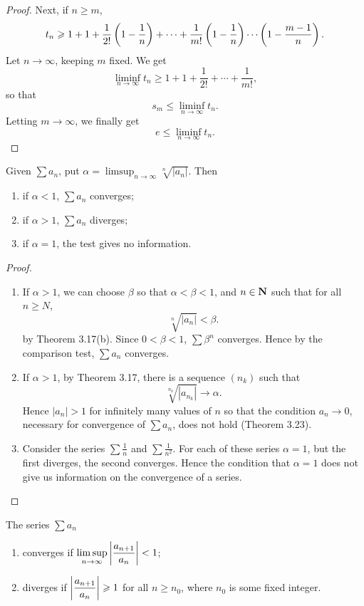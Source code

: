 \begin{example}
\begin{proof}
Next, if $n\ge m$,
\[t_n\geqslant1+1+\frac{1}{2!}\left(1-\frac{1}{n}\right)+\cdots+\frac{1}{m!}\left(1-\frac{1}{n}\right)\cdots\left(1-\frac{m-1}{n}\right).\]
Let $n\to\infty$, keeping $m$ fixed. We get
\[\liminf_{n\to\infty}t_n\ge1+1+\frac{1}{2!}+\cdots+\frac{1}{m!},\]
so that
\[s_m\le\liminf_{n\to\infty}t_n.\]
Letting $m\to\infty$, we finally get
\[e\le\liminf_{n\to\infty}t_n.\]

\end{proof}
\end{example}

\begin{lemma}\label{lemma:root-test}
Given $\sum a_n$, put $\displaystyle\alpha=\limsup_{n\to\infty}\sqrt[n]{|a_n|}$. Then
\begin{enumerate}[label=(\roman*)]
\item if $\alpha<1$, $\sum a_n$ converges;
\item if $\alpha>1$, $\sum a_n$ diverges;
\item if $\alpha=1$, the test gives no information.
\end{enumerate}
\end{lemma}

\begin{proof} \
\begin{enumerate}[label=(\roman*)]
\item If $\alpha>1$, we can choose $\beta$ so that $\alpha<\beta<1$, and $n\in\mathbf N$ such that for all $n\ge N$,
\[\sqrt[n]{|a_n|}<\beta.\]
by Theorem 3.17(b). Since $0<\beta<1$, $\sum\beta^n$ converges. Hence by the comparison test, $\sum a_n$ converges.

\item If $\alpha>1$, by Theorem 3.17, there is a sequence $(n_k)$ such that
\[\sqrt[n_k]{|a_{n_k}|}\to\alpha.\]
Hence $|a_n|>1$ for infinitely many values of $n$ so that the condition $a_n\to0$, necessary for convergence of $\sum a_n$, does not hold (Theorem 3.23).

\item Consider the series $\sum\frac{1}{n}$ and $\sum\frac{1}{n^2}$. For each of these series $\alpha=1$, but the first diverges, the second converges. Hence the condition that $\alpha=1$ does not give us information on the convergence of a series.
\end{enumerate}
\end{proof}

\begin{lemma}[Ratio test]\label{lemma:ratio-test}
The series $\sum a_n$
\begin{enumerate}[label=(\roman*)]
\item converges if $\displaystyle\limsup_{n\to\infty}\left|\frac{a_{n+1}}{a_n}\right|<1$;
\item diverges if $\displaystyle\left|\frac{a_{n+1}}{a_n}\right|\geqslant1$ for all $n\ge n_0$, where $n_0$ is some fixed integer.
\end{enumerate}
\end{lemma}

